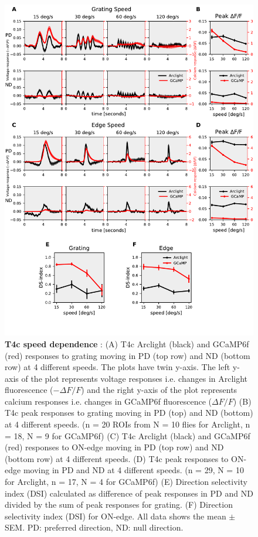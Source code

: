 \documentclass[9pt,lineno]{elife}
\begin{document}
\printbibliography[heading=bibintoc]

\begin{figure}
\begin{fullwidth}
\includegraphics[width=0.84\linewidth]{figure1}
\caption{\textbf{T4c speed dependence} : (A) T4c Arclight (black) and GCaMP6f (red) responses to grating moving in PD (top row) and ND (bottom row) at 4 different speeds. The plots have twin y-axis. The left y-axis of the plot represents voltage responses i.e. changes in Arclight fluorescence ($-\Delta F/F$) and the right y-axis of the plot represents calcium responses i.e. changes in GCaMP6f fluorescence ($\Delta F/F$) (B) T4c peak responses to grating moving in PD (top) and ND (bottom) at 4 different speeds. (n = 20 ROIs from N = 10 flies for Arclight, n = 18, N = 9 for GCaMP6f) (C) T4c Arclight (black) and GCaMP6f (red) responses to ON-edge moving in PD (top row) and ND (bottom row) at 4 different speeds. (D) T4c peak responses to ON-edge moving in PD and ND at 4 different speeds. (n = 29, N = 10 for Arclight, n = 17, N = 4 for GCaMP6f) (E) Direction selectivity index (DSI) calculated as difference of peak responses in PD and ND divided by the sum of peak responses for grating. (F) Direction selectivity index (DSI) for ON-edge. All data shows the mean $\pm$ SEM. PD: preferred direction, ND: null direction.}

\label{PDNDspeed}
	
\end{fullwidth}
\end{figure} 
\end{document}
